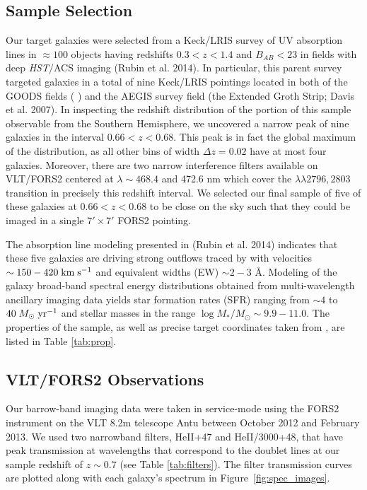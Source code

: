 \documentclass[twocolumn]{aastex61}
\def \mkms {{\rm \; km\;s^{-1}}}
\def \msunperyr {{\; M_{\odot}\rm \;yr^{-1}}}
\begin{document}
\subsection{Sample Selection}
Our target galaxies were selected from a Keck/LRIS survey of UV absorption lines in $\approx 100$ objects having redshifts $0.3< z < 1.4$ and $B_{AB}< 23$ in fields with deep \emph{HST}/ACS imaging (Rubin et al. 2014)\nocite{Rubin_2014}.  In particular, this parent survey targeted galaxies in a total of nine Keck/LRIS pointings located in both of the GOODS fields (\citeauthor{Giavalisco2004} \citeyear{Giavalisco2004}) and the AEGIS survey field (the Extended Groth Strip; Davis et al. 2007)\nocite{Davis2007}.  In inspecting the redshift distribution of the portion of this sample observable from the Southern Hemisphere, we uncovered a narrow peak of nine galaxies in the interval $0.66 < z < 0.68$.  This peak is in fact the global maximum of the distribution, as all other bins of width $\Delta z = 0.02$ have at most four galaxies.  Moreover, there are two narrow interference filters available on VLT/FORS2 centered at $\lambda \sim 468.4$ and 472.6 nm which cover the  $\lambda \lambda 2796, 2803$ transition in precisely this redshift interval.  We selected our final sample of five of these galaxies at $0.66 < z < 0.68$ to be close on the sky such that they could be imaged in a single $7' \times 7' $ FORS2 pointing.  

The absorption line modeling presented in (Rubin et al. 2014)\nocite{Rubin_2014} indicates that these five galaxies are driving strong outflows traced by   with velocities $\sim150-420\mkms$ and equivalent widths (EW) $\sim 2-3$ \AA.  Modeling of the galaxy broad-band spectral energy distributions obtained from multi-wavelength ancillary imaging data yields star formation rates (SFR) ranging from $\sim4$ to $40\msunperyr$ and stellar masses in the range $\log M_*/M_{\odot}\sim 9.9-11.0$. The properties of the sample, as well as precise target coordinates taken from \cite{Rubin_2014}, are listed in Table \ref{tab:prop}. 


\subsection{VLT/FORS2 Observations}
Our barrow-band imaging data were taken in service-mode using the FORS2 instrument on the VLT 8.2m telescope Antu between October 2012 and February 2013. 
We used two narrowband filters, HeII+47 and HeII/3000+48, that have peak transmission at wavelengths that correspond to the  doublet lines at our sample redshift of $z\sim0.7$ (see Table \ref{tab:filters}). The filter transmission curves are plotted along with each galaxy's spectrum in Figure~\ref{fig:spec_images}.
\end{document}
